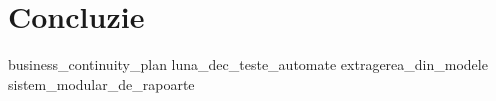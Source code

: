 \chapter*{Concluzie}
{business_continuity_plan}
{luna_dec_teste_automate}
{extragerea_din_modele}
{sistem_modular_de_rapoarte}
